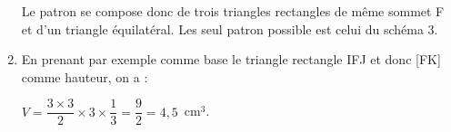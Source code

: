 \begin{enumerate}
Le patron se compose donc de trois triangles rectangles de même sommet F et d'un triangle équilatéral. Les seul patron possible est celui du schéma 3. 
\item %
En prenant par exemple comme base le triangle rectangle IFJ et donc [FK] comme hauteur, on a :

$V = \dfrac{3 \times 3}{2} \times 3\times \dfrac{1}{3} = \dfrac{9}{2} = 4,5$~cm$^3$.
\end{enumerate}

\bigskip

